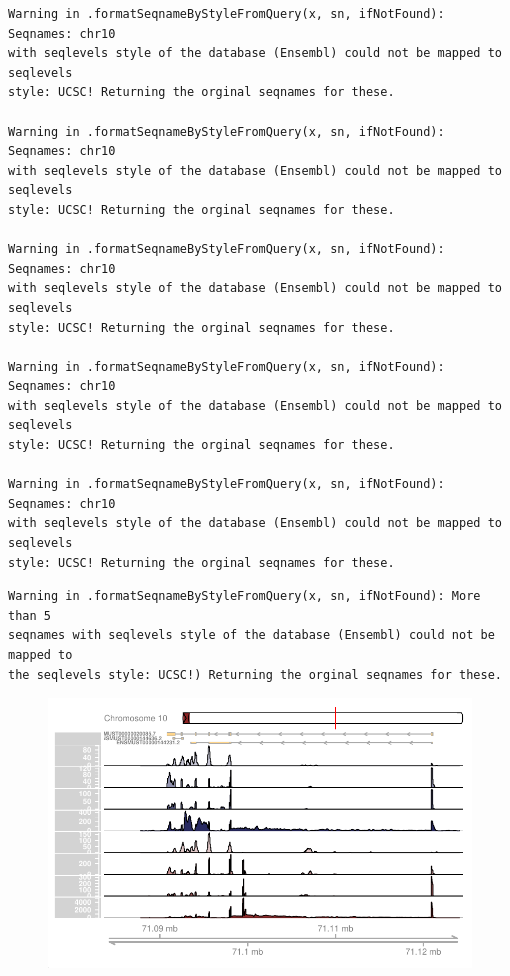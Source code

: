 \documentclass[
  letterpaper,
  DIV=11,
  numbers=noendperiod]{scrartcl}
\begin{document}
\begin{verbatim}
Warning in .formatSeqnameByStyleFromQuery(x, sn, ifNotFound): Seqnames: chr10
with seqlevels style of the database (Ensembl) could not be mapped to seqlevels
style: UCSC! Returning the orginal seqnames for these.

Warning in .formatSeqnameByStyleFromQuery(x, sn, ifNotFound): Seqnames: chr10
with seqlevels style of the database (Ensembl) could not be mapped to seqlevels
style: UCSC! Returning the orginal seqnames for these.

Warning in .formatSeqnameByStyleFromQuery(x, sn, ifNotFound): Seqnames: chr10
with seqlevels style of the database (Ensembl) could not be mapped to seqlevels
style: UCSC! Returning the orginal seqnames for these.

Warning in .formatSeqnameByStyleFromQuery(x, sn, ifNotFound): Seqnames: chr10
with seqlevels style of the database (Ensembl) could not be mapped to seqlevels
style: UCSC! Returning the orginal seqnames for these.

Warning in .formatSeqnameByStyleFromQuery(x, sn, ifNotFound): Seqnames: chr10
with seqlevels style of the database (Ensembl) could not be mapped to seqlevels
style: UCSC! Returning the orginal seqnames for these.
\end{verbatim}

\begin{verbatim}
Warning in .formatSeqnameByStyleFromQuery(x, sn, ifNotFound): More than 5
seqnames with seqlevels style of the database (Ensembl) could not be mapped to
the seqlevels style: UCSC!) Returning the orginal seqnames for these.
\end{verbatim}

\begin{figure}[H]

{\centering \includegraphics{visualization_bw_files/figure-pdf/test_example-2.pdf}

}

\end{figure}
\end{document}
